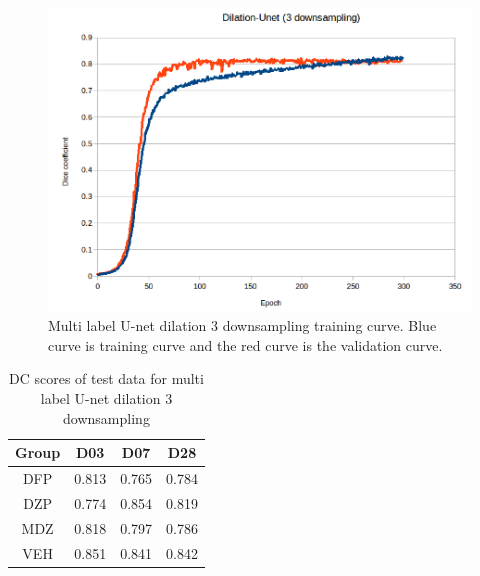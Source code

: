 \begin{figure}[!tbh]
\centering
\includegraphics[width=\textwidth]{results/train_results_multi_unetdil3.png}
\caption{Multi label U-net dilation 3 downsampling training curve. Blue curve is training curve and the red curve is the validation curve. }
\label{fig:results_multi_unetdil3_train}
\end{figure}

\begin{table}[tbh]
\renewcommand{\arraystretch}{1}
\centering
\begin{tabular}{|c|c|c|c|}
\hline
\textbf{Group} & \textbf{D03}& \textbf{D07}& \textbf{D28}\\
\hline
DFP & 0.813 & 0.765 & 0.784\\      
\hline
DZP & 0.774 & 0.854 & 0.819\\
\hline
MDZ & 0.818 & 0.797 & 0.786\\ 
\hline
VEH & 0.851 & 0.841 & 0.842\\ 
\hline
\end{tabular}
\caption{DC scores of test data for multi label U-net dilation 3 downsampling}
\label{tab.multi_model_results_unetdil3}
\end{table}


